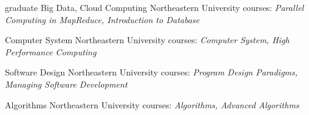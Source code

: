 \documentclass[]{ly-cv} %
\begin{document}
\begin{entrylist}
\entry
{graduate}
{Big Data, Cloud Computing}
{Northeastern University}
{courses: \emph{Parallel Computing in MapReduce, Introduction to Database}\vspace*{4pt}}
\end{entrylist}
\begin{entrylist}
\entry
{}
{Computer System}
{Northeastern University}
{courses: \emph{Computer System, High Performance Computing}\vspace*{4pt}}
\end{entrylist}
\begin{entrylist}
\entry
{}
{Software Design}
{Northeastern University}
{courses: \emph{Program Design Paradigms, Managing Software Development}\vspace*{4pt}}
\end{entrylist}
\begin{entrylist}
\entry
{}
{Algorithms}
{Northeastern University}
{courses: \emph{Algorithms, Advanced Algorithms}}
\end{entrylist}
\end{document}
